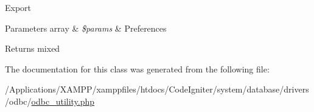 Export


\begin{DoxyParams}[1]{Parameters}
array & {\em \$params} & Preferences \\
\hline
\end{DoxyParams}
\begin{DoxyReturn}{Returns}
mixed 
\end{DoxyReturn}


The documentation for this class was generated from the following file\+:\begin{DoxyCompactItemize}
\item 
/\+Applications/\+X\+A\+M\+P\+P/xamppfiles/htdocs/\+Code\+Igniter/system/database/drivers/odbc/\mbox{\hyperlink{odbc__utility_8php}{odbc\+\_\+utility.\+php}}\end{DoxyCompactItemize}
